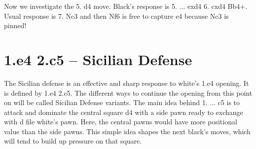 \documentclass[
10pt, %
a4paper, %
oneside, %
headinclude,footinclude, %
BCOR5mm, %
]{scrartcl}
\begin{document}

\newgame %





Now we investigate the 5. d4 move. Black's response is 5. ... exd4 6. cxd4 Bb4+. Usual response is 7. Nc3 and then Nf6 is free to capture e4 because Nc3 is pinned!















\begin{center}

\showboard

\end{center}

\newpage
\section{1.e4 2.c5 -- Sicilian Defense}

The Sicilian defense is an effective and sharp response to white's 1.e4 opening. It is defined by 1.e4 2.c5.
The different ways to continue the opening from this point on will be called Sicilian Defense variants. 
The main idea behind 1. ... c5 is to attack and dominate the central square d4 with a side pawn ready to exchange with d file white's pawn. Here, the central pawns would have more positional value than the side pawns. This simple idea shapes the next black's moves, which will tend to build up pressure on that square.
\end{document}
